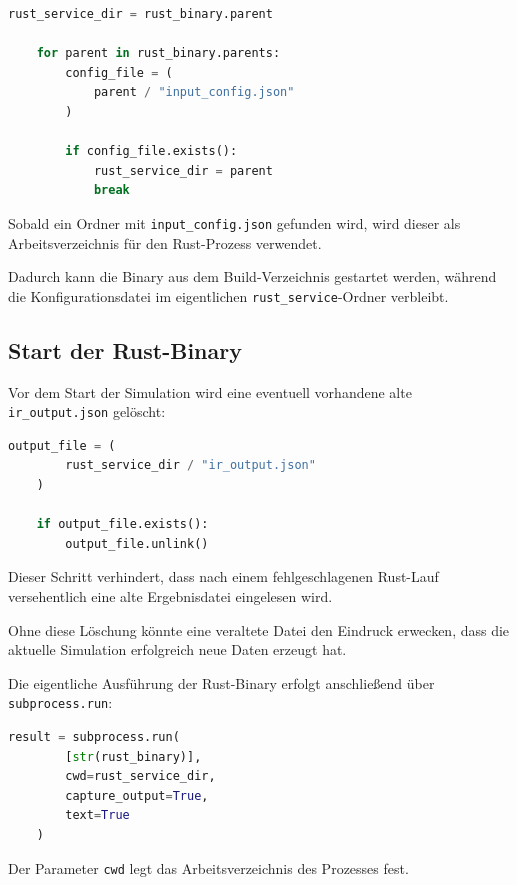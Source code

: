 \documentclass{article}
\begin{document}
    \begin{lstlisting}[language=Python]
    rust_service_dir = rust_binary.parent

    for parent in rust_binary.parents:
        config_file = (
            parent / "input_config.json"
        )

        if config_file.exists():
            rust_service_dir = parent
            break
    \end{lstlisting}

    Sobald ein Ordner mit \texttt{input\_config.json} gefunden wird, wird dieser
    als Arbeitsverzeichnis für den Rust-Prozess verwendet.

    Dadurch kann die Binary aus dem Build-Verzeichnis gestartet werden, während
    die Konfigurationsdatei im eigentlichen
    \texttt{rust\_service}-Ordner verbleibt.

    \subsection{Start der Rust-Binary}
    \label{subsec:start-rust-binary}

    Vor dem Start der Simulation wird eine eventuell vorhandene alte
    \texttt{ir\_output.json} gelöscht:

    \begin{lstlisting}[language=Python]
    output_file = (
        rust_service_dir / "ir_output.json"
    )

    if output_file.exists():
        output_file.unlink()
    \end{lstlisting}

    Dieser Schritt verhindert, dass nach einem fehlgeschlagenen Rust-Lauf
    versehentlich eine alte Ergebnisdatei eingelesen wird.

    Ohne diese Löschung könnte eine veraltete Datei den Eindruck erwecken, dass die
    aktuelle Simulation erfolgreich neue Daten erzeugt hat.

    Die eigentliche Ausführung der Rust-Binary erfolgt anschließend über
    \texttt{subprocess.run}:

    \begin{lstlisting}[language=Python]
    result = subprocess.run(
        [str(rust_binary)],
        cwd=rust_service_dir,
        capture_output=True,
        text=True
    )
    \end{lstlisting}

    Der Parameter \texttt{cwd} legt das Arbeitsverzeichnis des Prozesses fest.
\end{document}
